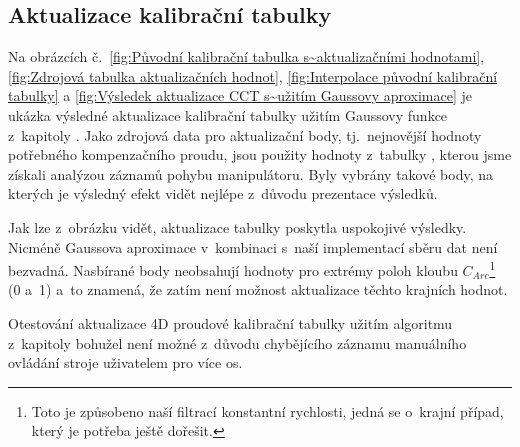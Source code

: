 \subsection{Aktualizace kalibrační tabulky}\label{section:aktualizace CCT}
Na obrázcích č.~\ref{fig:Původní kalibrační tabulka s~aktualizačními hodnotami}, \ref{fig:Zdrojová tabulka aktualizačních hodnot}, \ref{fig:Interpolace původní kalibrační tabulky} a \ref{fig:Výsledek aktualizace CCT s~užitím Gaussovy aproximace} je ukázka výsledné aktualizace kalibrační tabulky užitím Gaussovy funkce z~kapitoly . Jako zdrojová data pro aktualizační body, tj.~nejnovější hodnoty potřebného kompenzačního proudu, jsou použity hodnoty z~tabulky , kterou jsme získali analýzou záznamů pohybu manipulátoru. Byly vybrány takové body, na kterých je výsledný efekt vidět nejlépe z~důvodu prezentace výsledků.
\par
Jak lze z~obrázku vidět, aktualizace tabulky poskytla uspokojivé výsledky. Nicméně Gaussova aproximace v~kombinaci s~naší implementací sběru dat není bezvadná. Nasbírané body neobsahují hodnoty pro extrémy poloh kloubu $C_{Arc}$\footnote{Toto je způsobeno naší filtrací konstantní rychlosti, jedná se o~krajní případ, který je potřeba ještě dořešit.} (0 a~1) a~to znamená, že zatím není možnost aktualizace těchto krajních hodnot. 
\par
Otestování aktualizace 4D proudové kalibrační tabulky užitím algoritmu z~kapitoly  bohužel není možné z~důvodu chybějícího záznamu manuálního ovládání stroje uživatelem pro více os.
